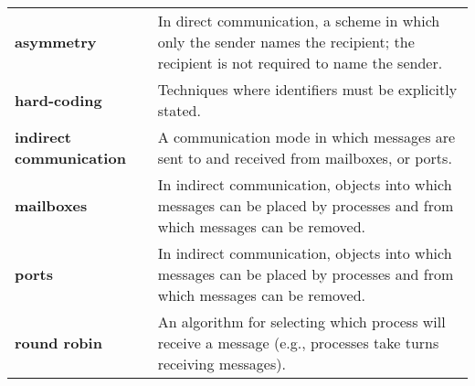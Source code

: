 \begin{tabular}{>{\raggedright}p{} >{\raggedright\arraybackslash}p{}}
\textbf{asymmetry} & In direct communication, a scheme in which only the sender names the recipient; the recipient is not required to name the sender. \\
\textbf{hard-coding} & Techniques where identifiers must be explicitly stated. \\
\textbf{indirect communication} & A communication mode in which messages are sent to and received from mailboxes, or ports. \\
\textbf{mailboxes} & In indirect communication, objects into which messages can be placed by processes and from which messages can be removed. \\
\textbf{ports} & In indirect communication, objects into which messages can be placed by processes and from which messages can be removed. \\
\textbf{round robin} & An algorithm for selecting which process will receive a message (e.g., processes take turns receiving messages). \\
\bottomrule
\end{tabular}
\vspace{\baselineskip}
